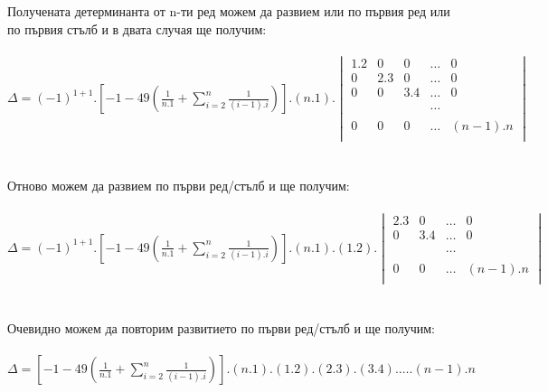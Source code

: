 \documentclass[a4paper, 12pt]{article}
\begin{document}
    Получената детерминанта от n-ти ред можем да развием или по първия ред или по първия стълб
    и в двата случая ще получим: \\\\
    
    $\Delta = (-1)^{1 + 1}.\left[-1 -49\left(\frac{1}{n.1} + \displaystyle\sum_{i = 2}^n \frac{1}{(i - 1).i}\right)\right].(n.1).\begin{vmatrix}
        1.2 & 0 & 0 & \dots & 0\\
        0 & 2.3 & 0 & \dots & 0\\
        0 & 0 & 3. 4 & \dots & 0\\
        \\
        ~ & ~ & ~ & \dots & ~ \\
        \\
        0 & 0 & 0 & \dots & (n - 1).n\\
    \end{vmatrix}$ \\\\\\

    Отново можем да развием по първи ред/стълб и ще получим: \\\\
    
    $\Delta = (-1)^{1 + 1}.\left[-1 -49\left(\frac{1}{n.1} + \displaystyle\sum_{i = 2}^n \frac{1}{(i - 1).i}\right)\right].(n.1).(1.2).\begin{vmatrix}
        2.3 & 0 & \dots & 0\\
        0 & 3. 4 & \dots & 0\\
        \\
        ~ & ~ & \dots & ~\\
        \\
        0 & 0 & \dots & (n - 1).n\\
    \end{vmatrix}$ \\\\\\

    Очевидно можем да повторим развитието по първи ред/стълб и ще получим: \\\\

    $\Delta = \left[-1 -49\left(\frac{1}{n.1} + \displaystyle\sum_{i = 2}^n \frac{1}{(i - 1).i}\right)\right].(n.1).(1.2).(2.3).(3.4).\dots.(n - 1).n$ \\\\\\
\end{document}
